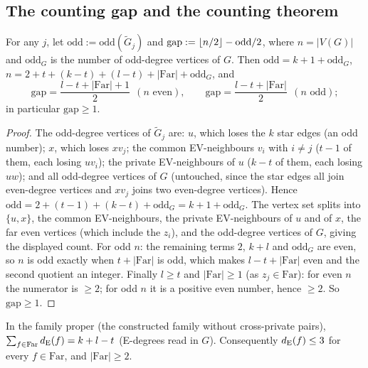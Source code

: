 \subsection{The counting gap and the counting theorem}

\begin{lemma}\label{com:lem-gapledger}
For any $j$, let $\mathrm{odd}:=\mathrm{odd}(\tilde G_j)$ and
$\mathrm{gap}:=\left\lfloor n/2 \right\rfloor-\mathrm{odd}/2$, where $n=|V(G)|$ and
$\mathrm{odd}_G$ is the number of odd-degree vertices of $G$. Then
$\mathrm{odd}=k+1+\mathrm{odd}_G$,
$n=2+t+(k-t)+(l-t)+|\mathrm{Far}|+\mathrm{odd}_G$, and
\[
\mathrm{gap}=\frac{l-t+|\mathrm{Far}|+1}{2}\ \ (n\text{ even}),
\qquad
\mathrm{gap}=\frac{l-t+|\mathrm{Far}|}{2}\ \ (n\text{ odd});
\]
in particular $\mathrm{gap}\ge1$.
\end{lemma}

\begin{proof}
The odd-degree vertices of $\tilde G_j$ are: $u$, which loses the $k$
star edges (an odd number); $x$, which loses $xv_j$; the common
EV-neighbours $v_i$ with $i\ne j$ ($t-1$ of them, each losing $uv_i$);
the private EV-neighbours of $u$ ($k-t$ of them, each losing $uw$); and
all odd-degree vertices of $G$ (untouched, since the star edges all join
even-degree vertices and $xv_j$ joins two even-degree vertices). Hence
$\mathrm{odd}=2+(t-1)+(k-t)+\mathrm{odd}_G=k+1+\mathrm{odd}_G$. The
vertex set splits into $\{u,x\}$, the common EV-neighbours, the private
EV-neighbours of $u$ and of $x$, the far even vertices (which include the
$z_i$), and the odd-degree vertices of $G$, giving the displayed count.
For odd $n$: the remaining terms $2$, $k+l$ and $\mathrm{odd}_G$ are even,
so $n$ is odd exactly when $t+|\mathrm{Far}|$ is odd, which makes
$l-t+|\mathrm{Far}|$ even and the second quotient an integer. Finally
$l\ge t$ and $|\mathrm{Far}|\ge1$ (as $z_j\in\mathrm{Far}$): for even $n$
the numerator is $\ge2$; for odd $n$ it is a positive even number, hence
$\ge2$. So $\mathrm{gap}\ge1$.
\end{proof}

\begin{lemma}\label{com:lem-load}
In the family proper (the constructed family without cross-private
pairs), $\sum_{f\in\mathrm{Far}}d_{\mathrm{E}}(f)=k+l-t$ (E-degrees read in $G$).
Consequently $d_{\mathrm{E}}(f)\le3$ for every $f\in\mathrm{Far}$, and
$|\mathrm{Far}|\ge2$.
\end{lemma}

